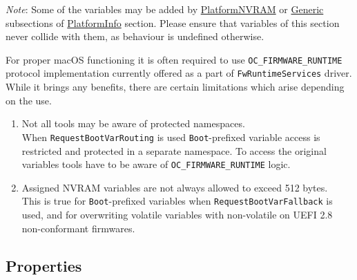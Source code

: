 \documentclass[]{article}
\makeatletter
\renewcommand{\label}[1]{%
\zref@wrapper@immediate{\oldlabel{#1}}}  %
\makeatother
\begin{document}
\emph{Note}: Some of the variables may be added by
\hyperref[platforminfonvram]{PlatformNVRAM} or
\hyperref[platforminfogeneric]{Generic} subsections of
\hyperref[platforminfo]{PlatformInfo} section.
Please ensure that variables of this section never collide with them,
as behaviour is undefined otherwise.

For proper macOS functioning it is often required to use \texttt{OC\_FIRMWARE\_RUNTIME}
protocol implementation currently offered as a part of \texttt{FwRuntimeServices} driver.
While it brings any benefits, there are certain limitations which arise depending on the
use.

\begin{enumerate}
\item Not all tools may be aware of protected namespaces.\\
  When \texttt{RequestBootVarRouting} is used \texttt{Boot}-prefixed variable access
  is restricted and protected in a separate namespace. To access the original variables
  tools have to be aware of \texttt{OC\_FIRMWARE\_RUNTIME} logic.
\item Assigned NVRAM variables are not always allowed to exceed 512 bytes.\\
  This is true for \texttt{Boot}-prefixed variables when \texttt{RequestBootVarFallback}
  is used, and for overwriting volatile variables with non-volatile on UEFI 2.8
  non-conformant firmwares.
\end{enumerate}

\subsection{Properties}\label{nvramprops}
\end{document}
